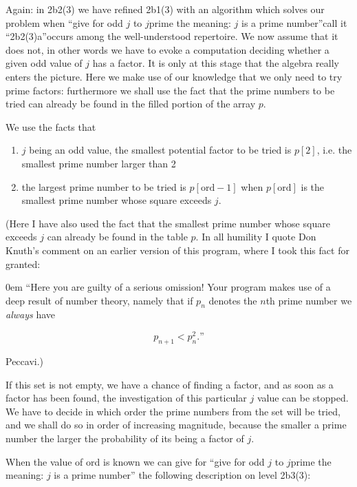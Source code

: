 \documentclass[twoside,11pt]{book}
\begin{document}
Again: in 2b2(3) we have refined 2b1(3) with an algorithm which solves our problem when ``give for odd $j$ to $j$prime the meaning: $j$ is a prime number''\textemdash{}call it ``2b2(3)a''\textemdash{}occurs among the well-understood repertoire. We now assume that it does not, in other words we have to evoke a computation deciding whether a given odd value of $j$ has a factor. It is only at this stage that the algebra really enters the picture. Here we make use of our knowledge that we only need to try prime factors: furthermore we shall use the fact that the prime numbers to be tried can already be found in the filled portion of the array $p$.

We use the facts that

\begin{enumerate}[wide, nosep, label=(\arabic*)]
	\item $j$ being an odd value, the smallest potential factor to be tried is $p[2]$, i.e. the smallest prime number larger than 2

	\item the largest prime number to be tried is $p[\text{ord} - 1]$ when $p[\text{ord}]$ is the smallest prime number whose square exceeds $j$.
\end{enumerate}

(Here I have also used the fact that the smallest prime number whose square exceeds $j$ can already be found in the table $p$. In all humility I quote Don Knuth's comment on an earlier version of this program, where I took this fact for granted:

\begin{addmargin}[\parindent]{0em}
``Here you are guilty of a serious omission! Your program makes use of a deep result of number theory, namely that if $p_n$ denotes the $n$th prime number we \textit{always} have
\end{addmargin}
$$
p_{n+1}<p_n^2.\text{''}
$$

\noindent
Peccavi.)

If this set is not empty, we have a chance of finding a factor, and as soon as a factor has been found, the investigation of this particular $j$ value can be stopped. We have to decide in which order the prime numbers from the set will be tried, and we shall do so in order of increasing magnitude, because the smaller a prime number the larger the probability of its being a factor of $j$.

When the value of ord is known we can give for ``give for odd $j$ to $j$prime the meaning: $j$ is a prime number'' the following description on level 2b3(3):
\end{document}
